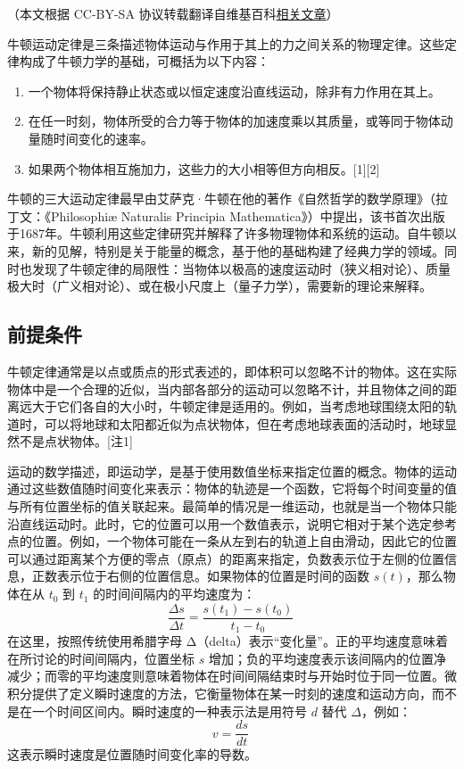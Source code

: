 
（本文根据 CC-BY-SA 协议转载翻译自维基百科\href{https://en.wikipedia.org/wiki/Newton\%27s_laws_of_motion#}{相关文章}）

牛顿运动定律是三条描述物体运动与作用于其上的力之间关系的物理定律。这些定律构成了牛顿力学的基础，可概括为以下内容：

\begin{enumerate}
\item 一个物体将保持静止状态或以恒定速度沿直线运动，除非有力作用在其上。
\item 在任一时刻，物体所受的合力等于物体的加速度乘以其质量，或等同于物体动量随时间变化的速率。
\item 如果两个物体相互施加力，这些力的大小相等但方向相反。[1][2]
\end{enumerate}
牛顿的三大运动定律最早由艾萨克·牛顿在他的著作《自然哲学的数学原理》（拉丁文：《Philosophiæ Naturalis Principia Mathematica》）中提出，该书首次出版于1687年。牛顿利用这些定律研究并解释了许多物理物体和系统的运动。自牛顿以来，新的见解，特别是关于能量的概念，基于他的基础构建了经典力学的领域。同时也发现了牛顿定律的局限性：当物体以极高的速度运动时（狭义相对论）、质量极大时（广义相对论）、或在极小尺度上（量子力学），需要新的理论来解释。
\subsection{前提条件 }
牛顿定律通常是以点或质点的形式表述的，即体积可以忽略不计的物体。这在实际物体中是一个合理的近似，当内部各部分的运动可以忽略不计，并且物体之间的距离远大于它们各自的大小时，牛顿定律是适用的。例如，当考虑地球围绕太阳的轨道时，可以将地球和太阳都近似为点状物体，但在考虑地球表面的活动时，地球显然不是点状物体。[注1]

运动的数学描述，即运动学，是基于使用数值坐标来指定位置的概念。物体的运动通过这些数值随时间变化来表示：物体的轨迹是一个函数，它将每个时间变量的值与所有位置坐标的值关联起来。最简单的情况是一维运动，也就是当一个物体只能沿直线运动时。此时，它的位置可以用一个数值表示，说明它相对于某个选定参考点的位置。例如，一个物体可能在一条从左到右的轨道上自由滑动，因此它的位置可以通过距离某个方便的零点（原点）的距离来指定，负数表示位于左侧的位置信息，正数表示位于右侧的位置信息。如果物体的位置是时间的函数 \( s(t) \)，那么物体在从 \( t_0 \) 到 \( t_1 \) 的时间间隔内的平均速度为：
\[
\frac{\Delta s}{\Delta t} = \frac{s(t_1) - s(t_0)}{t_1 - t_0}~
\]
在这里，按照传统使用希腊字母 Δ（delta）表示“变化量”。正的平均速度意味着在所讨论的时间间隔内，位置坐标 \( s \) 增加；负的平均速度表示该间隔内的位置净减少；而零的平均速度则意味着物体在时间间隔结束时与开始时位于同一位置。微积分提供了定义瞬时速度的方法，它衡量物体在某一时刻的速度和运动方向，而不是在一个时间区间内。瞬时速度的一种表示法是用符号 \( d \) 替代 \( \Delta \)，例如：
\[
v = \frac{ds}{dt}~
\]
这表示瞬时速度是位置随时间变化率的导数。

